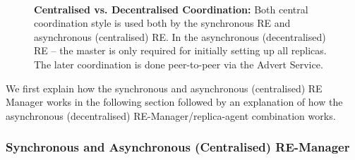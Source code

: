 \documentclass{rspublic}
\newcommand{\jhanote}[1]{ {\textcolor{red} { ***shantenu: #1 }}}
\newcommand{\alnote}[1]{ {\textcolor{blue} { ***andre: #1 }}}
\newcommand{\alnote}[1]{}
\newcommand{\jhanote}[1]{}
\begin{document}

\begin{figure}%
\centering
{}\qquad
{}\\
\caption{\textbf{Centralised vs. Decentralised Coordination:} Both
  central coordination style is used both by the synchronous RE  and asynchronous (centralised) RE.  In the asynchronous (decentralised) RE --
  the master is only required for initially setting up all
  replicas. The later coordination is done peer-to-peer via the Advert
  Service.}
\label{fig:coordination}
\end{figure}


We first explain how the synchronous and asynchronous (centralised) RE
Manager works in the following section followed by an explanation of
how the asynchronous (decentralised) RE-Manager/replica-agent
combination works.

\subsubsection{Synchronous and Asynchronous (Centralised) RE-Manager}
\end{document}
